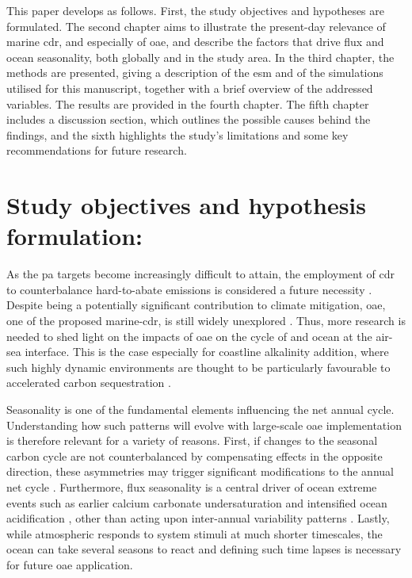 This paper develops as follows. First, the study objectives and hypotheses are formulated. The second chapter aims to illustrate the present-day relevance of marine \ac{cdr}, and especially of \ac{oae}, and describe the factors that drive  flux and ocean  seasonality, both globally and in the study area. In the third chapter, the methods are presented, giving a description of the \ac{esm} and of the simulations utilised for this manuscript, together with a brief overview of the addressed variables. The results are provided in the fourth chapter. The fifth chapter includes a discussion section, which outlines the possible causes behind the findings, and the sixth highlights the study's limitations and some key recommendations for future research. 

\section{Study objectives and hypothesis formulation:}

As the \ac{pa} targets become increasingly difficult to attain, the employment of \ac{cdr} to counterbalance hard-to-abate emissions is considered a future necessity \citep{IPCC_2022_WGIII_SPM, shukla2022summary}. Despite being a potentially significant contribution to climate mitigation, \ac{oae}, one of the proposed marine-\ac{cdr}, is still widely unexplored \citep{fakhraee2022environmental}. Thus, more research is needed to shed light on the impacts of \ac{oae} on the cycle of  and ocean  at the air-sea interface. This is the case especially for coastline alkalinity addition, where such highly dynamic environments are thought to be particularly favourable to accelerated carbon sequestration \citep{he2022limits, thomas2009enhanced}. 

Seasonality is one of the fundamental elements influencing the net annual  cycle. Understanding how such patterns will evolve with large-scale \ac{oae} implementation is therefore relevant for a variety of reasons. First, if changes to the seasonal carbon cycle are not counterbalanced by compensating effects in the opposite direction, these asymmetries may trigger significant modifications to the annual net cycle \citep{fassbender2022quantifying}. Furthermore,  flux seasonality is a central driver of ocean extreme events such as earlier calcium carbonate undersaturation \citep{kwiatkowski2022modified} and intensified ocean acidification \citep{sasse2015quantifying}, other than acting upon inter-annual variability patterns \citep{rustogi2023impact}. Lastly, while atmospheric  responds to system stimuli at much shorter timescales, the ocean can take several seasons to react \citep{salt2013variability} and defining such time lapses is necessary for future \ac{oae} application.

